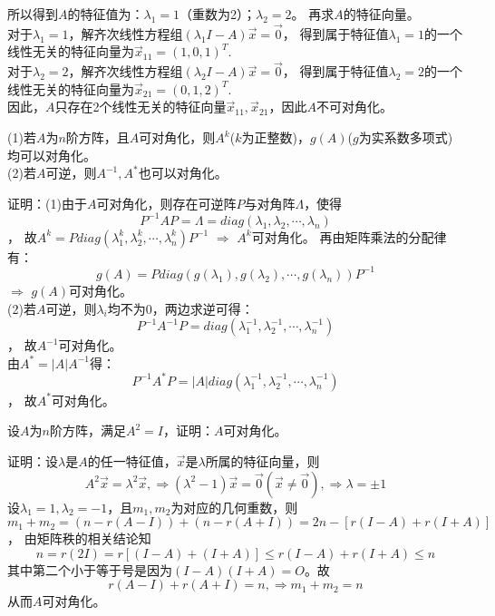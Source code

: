 所以得到$A$的特征值为：$\lambda_1=1$（重数为2）；$\lambda_2=2$。
再求$A$的特征向量。\\
对于$\lambda_1=1$，解齐次线性方程组$(\lambda_1 I-A)\vec{x}=\vec{0}$，
得到属于特征值$\lambda_1=1$的一个线性无关的特征向量为$\vec{x}_{11}=(1,0,1)^T$.\\
对于$\lambda_2=2$，解齐次线性方程组$(\lambda_2 I-A)\vec{x}=\vec{0}$，
得到属于特征值$\lambda_2=2$的一个线性无关的特征向量为$\vec{x}_{21}=(0,1,2)^T$.\\
因此，$A$只存在2个线性无关的特征向量$\vec{x}_{11},\vec{x}_{21}$，因此$A$不可对角化。

\begin{eg}
(1)若$A$为$n$阶方阵，且$A$可对角化，则$A^k$($k$为正整数)，$g(A)$($g$为实系数多项式)均可以对角化。\\
(2)若$A$可逆，则$A^{-1},A^{*}$也可以对角化。
\end{eg}
证明：(1)由于$A$可对角化，则存在可逆阵$P$与对角阵$\Lambda$，使得
$$P^{-1}AP=\Lambda=diag(\lambda_1,\lambda_2,\cdots,\lambda_n)$$，
故$A^k=Pdiag(\lambda_1^k,\lambda_2^k,\cdots,\lambda_n^k)P^{-1}$ $\Rightarrow$ $A^k$可对角化。
再由矩阵乘法的分配律有：
$$g(A) = P diag(g(\lambda_1),g(\lambda_2),\cdots,g(\lambda_n)) P^{-1}$$
$\Rightarrow$ $g(A)$可对角化。\\
(2)若$A$可逆，则$\lambda_i$均不为0，两边求逆可得：
$$P^{-1}A^{-1}P=diag(\lambda_1^{-1},\lambda_2^{-1},\cdots,\lambda_n^{-1})$$，
故$A^{-1}$可对角化。\\
由$A^*=|A|A^{-1}$得：
$$P^{-1}A^{*}P=|A|diag(\lambda_1^{-1},\lambda_2^{-1},\cdots,\lambda_n^{-1})$$，
故$A^*$可对角化。

\begin{eg}
设$A$为$n$阶方阵，满足$A^2=I$，证明：$A$可对角化。
\end{eg}
证明：设$\lambda$是$A$的任一特征值，$\vec{x}$是$\lambda$所属的特征向量，则
$$A^2\vec{x}=\lambda^2\vec{x},\Rightarrow(\lambda^2-1)\vec{x}=\vec{0}
(\vec{x}\neq\vec{0}),\Rightarrow\lambda=\pm 1$$
设$\lambda_1=1,\lambda_2=-1$，且$m_1,m_2$为对应的几何重数，则
$$m_1+m_2=(n-r(A-I))+(n-r(A+I))=2n-[r(I-A)+r(I+A)]$$，
由矩阵秩的相关结论知
$$n=r(2I)=r[(I-A)+(I+A)]\leq r(I-A)+r(I+A)\leq n$$
其中第二个小于等于号是因为$(I-A)(I+A)=O$。故
$$r(A-I)+r(A+I)=n,\Rightarrow m_1+m_2=n$$
从而$A$可对角化。

